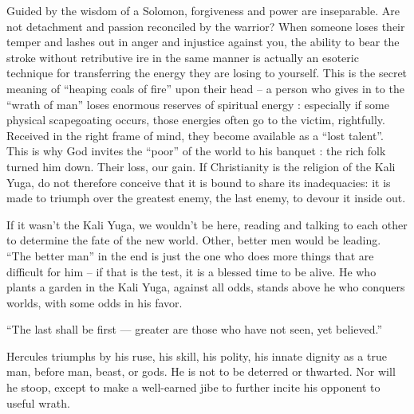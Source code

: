 Guided by the wisdom of a Solomon, forgiveness and power are inseparable. Are not detachment and passion reconciled by the warrior? When someone loses their temper and lashes out in anger and injustice against you, the ability to bear the stroke without retributive ire in the same manner is actually an esoteric technique for transferring the energy they are losing to yourself. This is the secret meaning of ``heaping coals of fire'' upon their head -- a person who gives in to the ``wrath of man'' loses enormous reserves of spiritual energy : especially if some physical scapegoating occurs, those energies often go to the victim, rightfully. Received in the right frame of mind, they become available as a ``lost talent''. This is why God invites the ``poor'' of the world to his banquet : the rich folk turned him down. Their loss, our gain. If Christianity is the religion of the Kali Yuga, do not therefore conceive that it is bound to share its inadequacies: it is made to triumph over the greatest enemy, the last enemy, to devour it inside out.

If it wasn't the Kali Yuga, we wouldn't be here, reading and talking to each other to determine the fate of the new world. Other, better men would be leading. ``The better man'' in the end is just the one who does more things that are difficult for him -- if that is the test, it is a blessed time to be alive. He who plants a garden in the Kali Yuga, against all odds, stands above he who conquers worlds, with some odds in his favor.

``The last shall be first --- greater are those who have not seen, yet believed.''

Hercules triumphs by his ruse, his skill, his polity, his innate dignity as a true man, before man, beast, or gods. He is not to be deterred or thwarted. Nor will he stoop, except to make a well-earned jibe to further incite his opponent to useful wrath.

